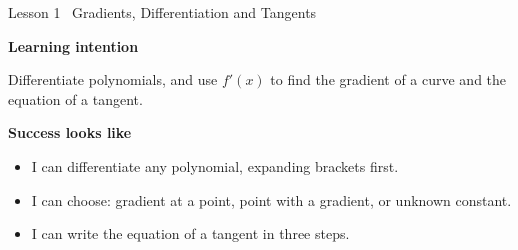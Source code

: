 \documentclass[aspectratio=169,11pt,t,xcolor=table]{beamer}
\begin{document}
\begin{frame}{Lesson 1 \textperiodcentered\ Gradients, Differentiation and Tangents}\relax
\vskip6mm
{\sEmph\bfseries Learning intention\par}\vskip2mm
Differentiate polynomials, and use $f'(x)$ to find the gradient of a curve and the equation of a tangent.
\vskip6mm
{\sEmph\bfseries Success looks like\par}\vskip2mm
\begin{itemize}
\item I can differentiate any polynomial, expanding brackets first.
\item I can choose: gradient at a point, point with a gradient, or unknown constant.
\item I can write the equation of a tangent in three steps.
\end{itemize}
\end{frame}
\end{document}
